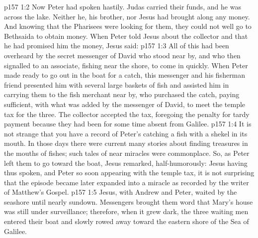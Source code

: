 \vs p157 1:2 Now Peter had spoken hastily. Judas carried their funds, and he was across the lake. Neither he, his brother, nor Jesus had brought along any money. And knowing that the Pharisees were looking for them, they could not well go to Bethsaida to obtain money. When Peter told Jesus about the collector and that he had promised him the money, Jesus said: 
\vs p157 1:3 All of this had been overheard by the secret messenger of David who stood near by, and who then signalled to an associate, fishing near the shore, to come in quickly. When Peter made ready to go out in the boat for a catch, this messenger and his fisherman friend presented him with several large baskets of fish and assisted him in carrying them to the fish merchant near by, who purchased the catch, paying sufficient, with what was added by the messenger of David, to meet the temple tax for the three. The collector accepted the tax, foregoing the penalty for tardy payment because they had been for some time absent from Galilee.
\vs p157 1:4 It is not strange that you have a record of Peter’s catching a fish with a shekel in its mouth. In those days there were current many stories about finding treasures in the mouths of fishes; such tales of near miracles were commonplace. So, as Peter left them to go toward the boat, Jesus remarked, half\hyp{}humorously:  Jesus having thus spoken, and Peter so soon appearing with the temple tax, it is not surprising that the episode became later expanded into a miracle as recorded by the writer of Matthew’s Gospel.
\vs p157 1:5 Jesus, with Andrew and Peter, waited by the seashore until nearly sundown. Messengers brought them word that Mary’s house was still under surveillance; therefore, when it grew dark, the three waiting men entered their boat and slowly rowed away toward the eastern shore of the Sea of Galilee.
